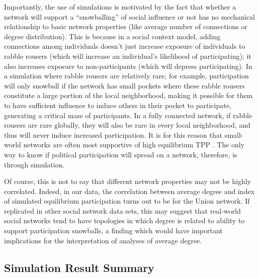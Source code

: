 \documentclass[12pt]{article}
\begin{document}
Importantly, the use of simulations is motivated by the fact that whether a network will support a ``snowballing'' of social influence or not has no mechanical relationship to basic network properties (like average number of connections or degree distribution). This is because in a social context model, adding connections among individuals doesn't just increase exposure of individuals to rabble rousers (which will increase an individual's likelihood of participating); it also increases exposure to non-participants (which will depress participating). In a simulation where rabble rousers are relatively rare, for example, participation will only snowball if the network has small pockets where these rabble rousers constitute a large portion of the local neighborhood, making it possible for them to have sufficient influence to induce others in their pocket to participate, generating a critical mass of participants. In a fully connected network, if rabble rousers are rare globally, they will also be rare in every local neighborhood, and thus will never induce increased participation. It is for this reason that small-world networks are often most supportive of high equilibrium TPP \cite{Siegel:2009vi}. The only way to know if political participation will spread on a network, therefore, is through simulation.

Of course, this is not to say that different network properties may not be highly correlated. Indeed, in our data, the correlation between average degree and index of simulated equilibrium participation turns out to be  for the Union network. If replicated in other social network data sets, this may suggest that real-world social networks tend to have topologies in which degree is related to ability to support participation snowballs, a finding which would have important implications for the interpretation of analyses of average degree.

\subsection{Simulation Result Summary}
\end{document}
